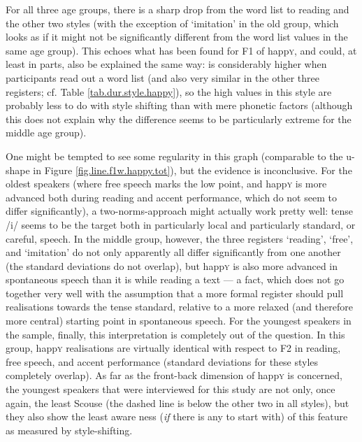 For all three age groups, there is a sharp drop from the word list to reading and the other two styles (with the exception of `imitation' in the old group, which looks as if it might not be significantly different from the word list values in the same age group).
This echoes what has been found for F1 of happ\textsc{y}, and could, at least in parts, also be explained the same way:  is considerably higher when participants read out a word list (and also very similar in the other three registers; cf. Table \ref{tab.dur.style.happy}), so the high values in this style are probably less to do with style shifting than with mere phonetic factors (although this does not explain why the difference seems to be particularly extreme for the middle age group).

One might be tempted to see some regularity in this graph (comparable to the u-shape in Figure \ref{fig.line.f1w.happy.tot}), but the evidence is inconclusive.
For the oldest speakers (where free speech marks the low point, and happ\textsc{y} is more advanced both during reading and accent performance, which do not seem to differ significantly), a two-norms-approach might actually work pretty well: tense /i/ seems to be the target both in particularly local and particularly standard, or careful, speech.
In the middle group, however, the three registers `reading', `free', and `imitation' do not only apparently all differ significantly from one another (the standard deviations do not overlap), but happ\textsc{y} is also more advanced in spontaneous speech than it is while reading a text --- a fact, which does not go together very well with the assumption that a more formal register should pull realisations towards the tense standard, relative to a more relaxed (and therefore more central) starting point in spontaneous speech.
For the youngest speakers in the sample, finally, this interpretation is completely out of the question.
In this group, happ\textsc{y} realisations are virtually identical with respect to F2 in reading, free speech, and accent performance (standard deviations for these styles completely overlap).
As far as the front-back dimension of happ\textsc{y} is concerned, the youngest speakers that were interviewed for this study are not only, once again, the least Scouse (the dashed line is below the other two in all styles), but they also show the least aware ness (\emph{if} there is any to start with) of this feature as measured by style-shifting.

